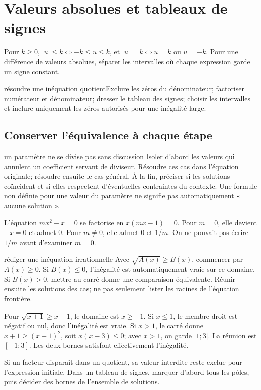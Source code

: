 \section{Valeurs absolues et tableaux de signes}
\begin{propriete}Pour $k\ge0$, $|u|\le k\Leftrightarrow-k\le u\le k$, et $|u|=k\Leftrightarrow u=k$ ou $u=-k$. Pour une différence de valeurs absolues, séparer les intervalles où chaque expression garde un signe constant.\end{propriete}
\begin{methode}{résoudre une inéquation quotient}Exclure les zéros du dénominateur; factoriser numérateur et dénominateur; dresser le tableau des signes; choisir les intervalles et inclure uniquement les zéros autorisés pour une inégalité large.\end{methode}


\subsection*{Conserver l’équivalence à chaque étape}
\begin{methode}{un paramètre ne se divise pas sans discussion}
Isoler d’abord les valeurs qui annulent un coefficient servant de diviseur. Résoudre ces cas dans l’équation originale; résoudre ensuite le cas général. À la fin, préciser si les solutions coïncident et si elles respectent d’éventuelles contraintes du contexte. Une formule non définie pour une valeur du paramètre ne signifie pas automatiquement « aucune solution ».
\end{methode}
\begin{exemple}
L’équation $mx^2-x=0$ se factorise en $x(mx-1)=0$. Pour $m=0$, elle devient $-x=0$ et admet $0$. Pour $m\ne0$, elle admet $0$ et $1/m$. On ne pouvait pas écrire $1/m$ avant d’examiner $m=0$.
\end{exemple}
\begin{methode}{rédiger une inéquation irrationnelle}
Avec $\sqrt{A(x)}\ge B(x)$, commencer par $A(x)\ge0$. Si $B(x)\le0$, l’inégalité est automatiquement vraie sur ce domaine. Si $B(x)>0$, mettre au carré donne une comparaison équivalente. Réunir ensuite les solutions des cas; ne pas seulement lister les racines de l’équation frontière.
\end{methode}
\begin{exemple}
Pour $\sqrt{x+1}\ge x-1$, le domaine est $x\ge-1$. Si $x\le1$, le membre droit est négatif ou nul, donc l’inégalité est vraie. Si $x>1$, le carré donne $x+1\ge(x-1)^2$, soit $x(x-3)\le0$; avec $x>1$, on garde $]1;3]$. La réunion est $[-1;3]$. Les deux bornes satisfont effectivement l’inégalité.
\end{exemple}
\begin{avertissement}
Si un facteur disparaît dans un quotient, sa valeur interdite reste exclue pour l’expression initiale. Dans un tableau de signes, marquer d’abord tous les pôles, puis décider des bornes de l’ensemble de solutions.
\end{avertissement}

